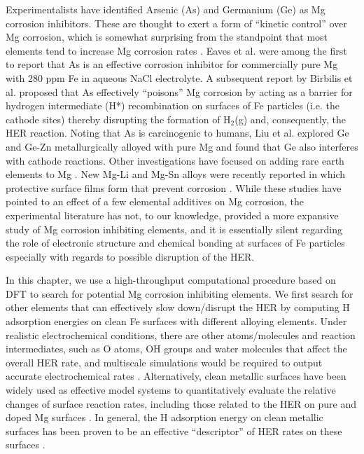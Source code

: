 Experimentalists have identified Arsenic (As) and Germanium (Ge) as Mg corrosion inhibitors. These are thought to exert a form of “kinetic control” over Mg corrosion, which is somewhat surprising from the standpoint that most elements tend to increase Mg corrosion rates \cite{liu2016controlling}. Eaves et al. \cite{eaves2012inhibition} were among the first to report that As is an effective corrosion inhibitor for commercially pure Mg with 280 ppm Fe in aqueous NaCl electrolyte. A subsequent report by Birbilis et al. \cite{birbilis2014evidence} proposed that As effectively ``poisons'' Mg corrosion by acting as a barrier for hydrogen intermediate (H*) recombination on surfaces of Fe particles (i.e. the cathode sites) thereby disrupting the formation of $\text{H}_2$(g) and, consequently, the \ac{HER} reaction. Noting that As is carcinogenic to humans, Liu et al. \cite{liu2016controlling,liu2018simultaneously} explored Ge and Ge-Zn metallurgically alloyed with pure Mg and found that Ge also interferes with cathode reactions. Other investigations have focused on adding rare earth elements to Mg \cite{birbilis2009corrosion,liu2009effect,shi2013corrosion}. New Mg-Li and Mg-Sn alloys were recently reported in which protective surface films form that prevent corrosion \cite{xu2015high,cain2019corrosion}. While these studies have pointed to an effect of a few elemental additives on Mg corrosion, the experimental literature has not, to our knowledge, provided a more expansive study of Mg corrosion inhibiting elements, and it is essentially silent regarding the role of electronic structure and chemical bonding at surfaces of Fe particles especially with regards to possible disruption of the \ac{HER}.

In this chapter, we use a high-throughput computational procedure based on \ac{DFT} to search for potential Mg corrosion inhibiting elements. We first search for other elements that can effectively slow down/disrupt the \ac{HER} by computing H adsorption energies on clean Fe surfaces with different alloying elements. Under realistic electrochemical conditions, there are other atoms/molecules and reaction intermediates, such as O atoms, OH groups and water molecules that affect the overall \ac{HER} rate, and multiscale simulations would be required to output accurate electrochemical rates \cite{qi2012adsorbate}. Alternatively, clean metallic surfaces have been widely used as effective model systems to quantitatively evaluate the relative changes of surface reaction rates, including those related to the \ac{HER} on pure and doped Mg surfaces \cite{williams2016modeling,pozzo2009hydrogen}. In general, the H adsorption energy on clean metallic surfaces has been proven to be an effective ``descriptor'' of \ac{HER} rates on these surfaces \cite{greeley2006computational}.

